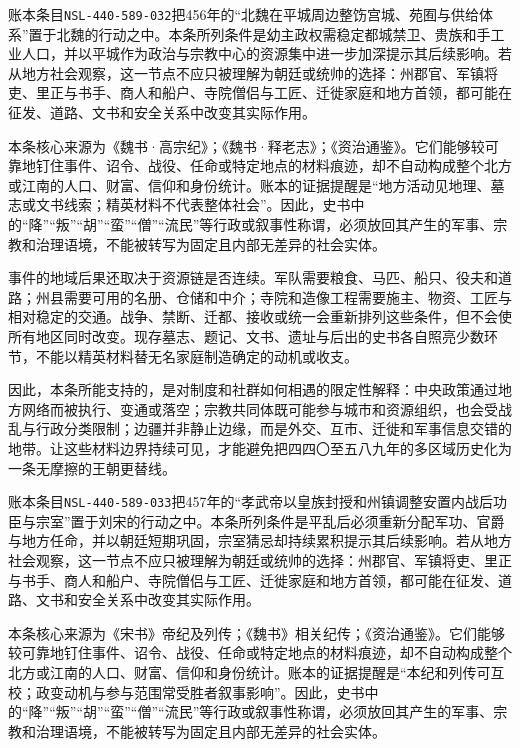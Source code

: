账本条目\texttt{NSL-440-589-032}把456年的“北魏在平城周边整饬宫城、苑囿与供给体系”置于北魏的行动之中。本条所列条件是幼主政权需稳定都城禁卫、贵族和手工业人口，并以平城作为政治与宗教中心的资源集中进一步加深提示其后续影响。若从地方社会观察，这一节点不应只被理解为朝廷或统帅的选择：州郡官、军镇将吏、里正与书手、商人和船户、寺院僧侣与工匠、迁徙家庭和地方首领，都可能在征发、道路、文书和安全关系中改变其实际作用。

本条核心来源为《魏书·高宗纪》；《魏书·释老志》；《资治通鉴》。它们能够较可靠地钉住事件、诏令、战役、任命或特定地点的材料痕迹，却不自动构成整个北方或江南的人口、财富、信仰和身份统计。账本的证据提醒是“地方活动见地理、墓志或文书线索；精英材料不代表整体社会”。因此，史书中的“降”“叛”“胡”“蛮”“僧”“流民”等行政或叙事性称谓，必须放回其产生的军事、宗教和治理语境，不能被转写为固定且内部无差异的社会实体。

事件的地域后果还取决于资源链是否连续。军队需要粮食、马匹、船只、役夫和道路；州县需要可用的名册、仓储和中介；寺院和造像工程需要施主、物资、工匠与相对稳定的交通。战争、禁断、迁都、接收或统一会重新排列这些条件，但不会使所有地区同时改变。现存墓志、题记、文书、遗址与后出的史书各自照亮少数环节，不能以精英材料替无名家庭制造确定的动机或收支。

因此，本条所能支持的，是对制度和社群如何相遇的限定性解释：中央政策通过地方网络而被执行、变通或落空；宗教共同体既可能参与城市和资源组织，也会受战乱与行政分类限制；边疆并非静止边缘，而是外交、互市、迁徙和军事信息交错的地带。让这些材料边界持续可见，才能避免把四四〇至五八九年的多区域历史化为一条无摩擦的王朝更替线。

账本条目\texttt{NSL-440-589-033}把457年的“孝武帝以皇族封授和州镇调整安置内战后功臣与宗室”置于刘宋的行动之中。本条所列条件是平乱后必须重新分配军功、官爵与地方任命，并以朝廷短期巩固，宗室猜忌却持续累积提示其后续影响。若从地方社会观察，这一节点不应只被理解为朝廷或统帅的选择：州郡官、军镇将吏、里正与书手、商人和船户、寺院僧侣与工匠、迁徙家庭和地方首领，都可能在征发、道路、文书和安全关系中改变其实际作用。

本条核心来源为《宋书》帝纪及列传；《魏书》相关纪传；《资治通鉴》。它们能够较可靠地钉住事件、诏令、战役、任命或特定地点的材料痕迹，却不自动构成整个北方或江南的人口、财富、信仰和身份统计。账本的证据提醒是“本纪和列传可互校；政变动机与参与范围常受胜者叙事影响”。因此，史书中的“降”“叛”“胡”“蛮”“僧”“流民”等行政或叙事性称谓，必须放回其产生的军事、宗教和治理语境，不能被转写为固定且内部无差异的社会实体。

